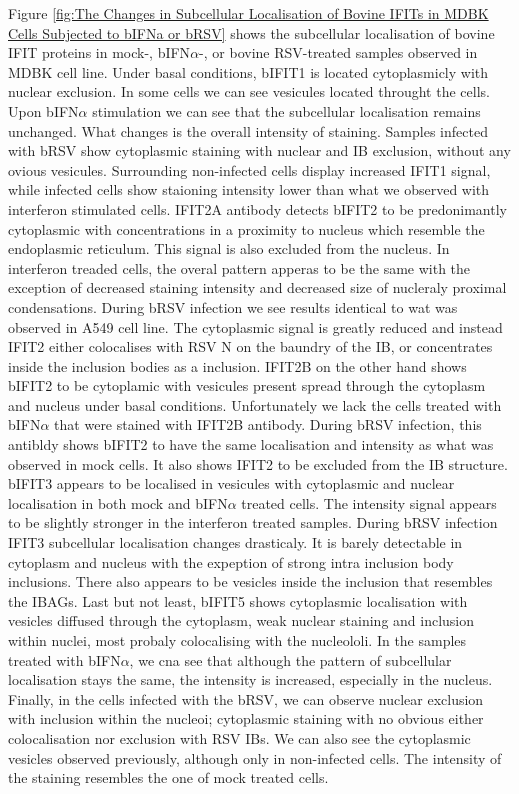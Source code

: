 Figure \ref{fig:The Changes in Subcellular Localisation of Bovine IFITs in MDBK Cells Subjected to bIFNa or bRSV} shows the subcellular localisation of bovine IFIT proteins in mock-, bIFN\(\alpha\)-, or bovine RSV-treated samples observed in MDBK cell line. Under basal conditions, bIFIT1 is located cytoplasmicly with nuclear exclusion. In some cells we can see vesicules located throught the cells. Upon bIFN\(\alpha\) stimulation we can see that the subcellular localisation remains unchanged. What changes is the overall intensity of staining. Samples infected with bRSV show cytoplasmic staining with nuclear and IB exclusion, without any ovious vesicules. Surrounding non-infected cells display increased IFIT1 signal, while infected cells show staioning intensity lower than what we observed with interferon stimulated cells. IFIT2A antibody detects bIFIT2 to be predonimantly cytoplasmic with concentrations in a proximity to nucleus which resemble the endoplasmic reticulum. This signal is also excluded from the nucleus. In interferon treaded cells, the overal pattern apperas to be the same with the exception of decreased staining intensity and decreased size of nucleraly proximal condensations. During bRSV infection we see results identical to wat was observed in A549 cell line. The cytoplasmic signal is greatly reduced and instead IFIT2 either colocalises with RSV N on the baundry of the IB, or concentrates inside the inclusion bodies as a inclusion. IFIT2B on the other hand shows bIFIT2 to be cytoplamic with vesicules present spread through the cytoplasm and nucleus under basal conditions. Unfortunately we lack the cells treated with bIFN\(\alpha\) that were stained with IFIT2B antibody. During bRSV infection, this antibldy shows bIFIT2 to have the same localisation and intensity as what was observed in mock cells. It also shows IFIT2 to be excluded from the IB structure. bIFIT3 appears to be localised in vesicules with cytoplasmic and nuclear localisation in both mock and bIFN\(\alpha\) treated cells. The intensity signal appears to be slightly stronger in the interferon treated samples. During bRSV infection IFIT3 subcellular localisation changes drasticaly. It is barely detectable in cytoplasm and nucleus with the expeption of strong intra inclusion body inclusions. There also appears to be vesicles inside the inclusion that resembles the IBAGs. Last but not least, bIFIT5 shows cytoplasmic localisation with vesicles diffused through the cytoplasm, weak nuclear staining and inclusion within nuclei, most probaly colocalising with the nucleololi. In the samples treated with bIFN\(\alpha\), we cna see that although the pattern of subcellular localisation stays the same, the intensity is increased, especially in the nucleus. Finally, in the cells infected with the bRSV, we can observe nuclear exclusion with inclusion within the nucleoi; cytoplasmic staining with no obvious either colocalisation nor exclusion with RSV IBs. We can also see the cytoplasmic vesicles observed previously, although only in non-infected cells. The intensity of the staining resembles the one of mock treated cells.

